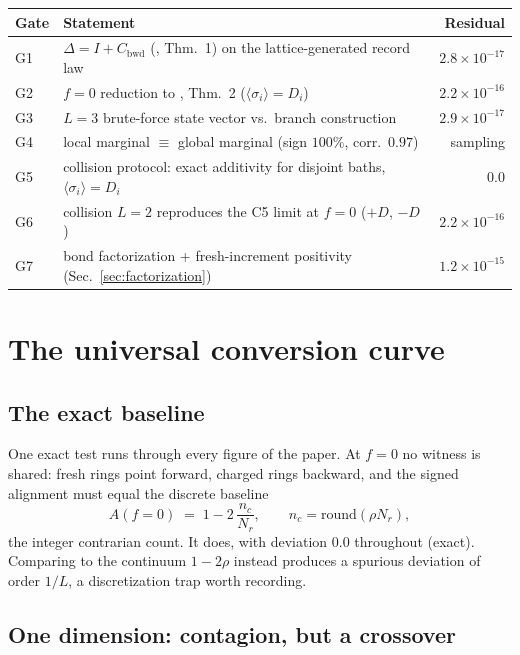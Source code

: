 \documentclass[11pt]{article}
\begin{document}
\begin{center}
\begin{tabular}{llr}
\toprule
Gate & Statement & Residual \\
\midrule
G1 & $\Delta = I + C_{\mathrm{bwd}}$ (\cite{p2}, Thm.~1) on the lattice-generated record law & $2.8\times 10^{-17}$ \\
G2 & $f=0$ reduction to \cite{p1}, Thm.~2 ($\langle\sigma_i\rangle = D_i$) & $2.2\times 10^{-16}$ \\
G3 & $L=3$ brute-force state vector vs.\ branch construction & $2.9\times 10^{-17}$ \\
G4 & local marginal $\equiv$ global marginal (sign $100\%$, corr.\ $0.97$) & sampling \\
G5 & collision protocol: exact additivity for disjoint baths, $\langle\sigma_i\rangle = D_i$ & $0.0$ \\
G6 & collision $L=2$ reproduces the \cite{p2} C5 limit at $f=0$ ($+D$, $-D$) & $2.2\times 10^{-16}$ \\
G7 & bond factorization + fresh-increment positivity (Sec.~\ref{sec:factorization}) & $1.2\times 10^{-15}$ \\
\bottomrule
\end{tabular}
\end{center}

\section{The universal conversion curve}
\label{sec:conversion}

\subsection{The exact baseline}

One exact test runs through every figure of the paper. At $f = 0$ no witness
is shared: fresh rings point forward, charged rings backward, and the signed
alignment must equal the discrete baseline
%
\begin{equation}
A(f{=}0) \;=\; 1 - 2\,\frac{n_c}{N_r}, \qquad n_c = \mathrm{round}(\rho N_r),
\label{eq:baseline}
\end{equation}
%
the integer contrarian count. It does, with deviation $0.0$ throughout
(exact). Comparing to the continuum $1-2\rho$ instead produces a spurious
deviation of order $1/L$, a discretization trap worth recording.

\subsection{One dimension: contagion, but a crossover}
\end{document}
